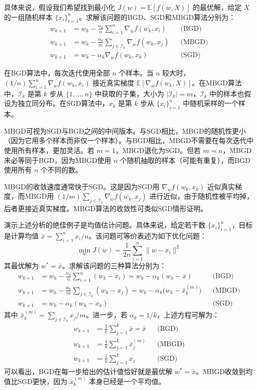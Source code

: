 \documentclass[UTF8]{article}
\begin{document}
具体来说，假设我们希望找到最小化 $J(w) = \mathbb{E}[f(w, X)]$ 的最优解，给定 $X$ 的一组随机样本 $\{x_i\}_{i=1}^{n}$。求解该问题的BGD、SGD和MBGD算法分别为：
\[
\begin{aligned}
w_{k+1} &= w_k - \frac{\alpha_k}{n}\sum_{i=1}^{n} \nabla_w f(w_k, x_i) &&\text{(BGD)} \\[6pt]
w_{k+1} &= w_k - \frac{\alpha_k}{m}\sum_{j \in \mathcal{I}_k} \nabla_w f(w_k, x_j) &&\text{(MBGD)} \\[6pt]
w_{k+1} &= w_k - \alpha_k \nabla_w f(w_k, x_k) &&\text{(SGD)}
\end{aligned}
\]

在BGD算法中，每次迭代使用全部 $n$ 个样本。当 $n$ 较大时，$(1/n)\sum_{i=1}^{n} \nabla_w f(w_k, x_i)$ 接近真实梯度 $\mathbb{E}[\nabla_w f(w_k, X)]$。在MBGD算法中，$\mathcal{I}_k$ 是第 $k$ 步从 $\{1,\dots,n\}$ 中获取的子集，大小为 $|\mathcal{I}_k| = m$，$\mathcal{I}_k$ 中的样本也假设为独立同分布。在SGD算法中，$x_k$ 是第 $k$ 步从 $\{x_i\}_{i=1}^{n}$ 中随机采样的一个样本。

MBGD可视为SGD与BGD之间的中间版本。与SGD相比，MBGD的随机性更小（因为它用多个样本而非仅一个样本）。与BGD相比，MBGD不需要在每次迭代中使用所有样本，更加灵活。若 $m = 1$，MBGD退化为SGD。但若 $m = n$，MBGD未必等同于BGD，因为MBGD使用 $n$ 个随机抽取的样本（可能有重复），而BGD使用所有 $n$ 个不同的数。

MBGD的收敛速度通常快于SGD。这是因为SGD用 $\nabla_w f(w_k, x_k)$ 近似真实梯度，而MBGD用 $(1/m)\sum_{j \in \mathcal{I}_k} \nabla_w f(w_k, x_j)$ 进行近似，由于随机性被平均掉，后者更接近真实梯度。MBGD算法的收敛性可类似SGD情形证明。

演示上述分析的绝佳例子是均值估计问题。具体来说，给定若干数 $\{x_i\}_{i=1}^{n}$，目标是计算均值 $\bar{x} = \sum_{i=1}^{n} x_i/n$。该问题可等价表述为如下优化问题：
\[
\min_w J(w) = \frac{1}{2n}\sum_{i=1}^{n} \|w - x_i\|^2
\]
其最优解为 $w^* = \bar{x}$。求解该问题的三种算法分别为：
\[
\begin{aligned}
w_{k+1} &= w_k - \frac{\alpha_k}{n}\sum_{i=1}^{n}(w_k - x_i) = w_k - \alpha_k(w_k - \bar{x}) &&\text{(BGD)} \\[6pt]
w_{k+1} &= w_k - \frac{\alpha_k}{m}\sum_{j \in \mathcal{I}_k}(w_k - x_j) = w_k - \alpha_k\big(w_k - \bar{x}_k^{(m)}\big) &&\text{(MBGD)} \\[6pt]
w_{k+1} &= w_k - \alpha_k(w_k - x_k) &&\text{(SGD)}
\end{aligned}
\]
其中 $\bar{x}_k^{(m)} = \sum_{j \in \mathcal{I}_k} x_j / m$。进一步，若 $\alpha_k = 1/k$，上述方程可解为：
\[
\begin{aligned}
w_{k+1} &= \frac{1}{k}\sum_{j=1}^{k} \bar{x} = \bar{x} &&\text{(BGD)} \\[4pt]
w_{k+1} &= \frac{1}{k}\sum_{j=1}^{k} \bar{x}_j^{(m)} &&\text{(MBGD)} \\[4pt]
w_{k+1} &= \frac{1}{k}\sum_{j=1}^{k} x_j &&\text{(SGD)}
\end{aligned}
\]
可以看出，BGD在每一步给出的估计值恰好就是最优解 $w^* = \bar{x}$。MBGD收敛到均值比SGD更快，因为 $\bar{x}_k^{(m)}$ 本身已经是一个平均值。
\end{document}
